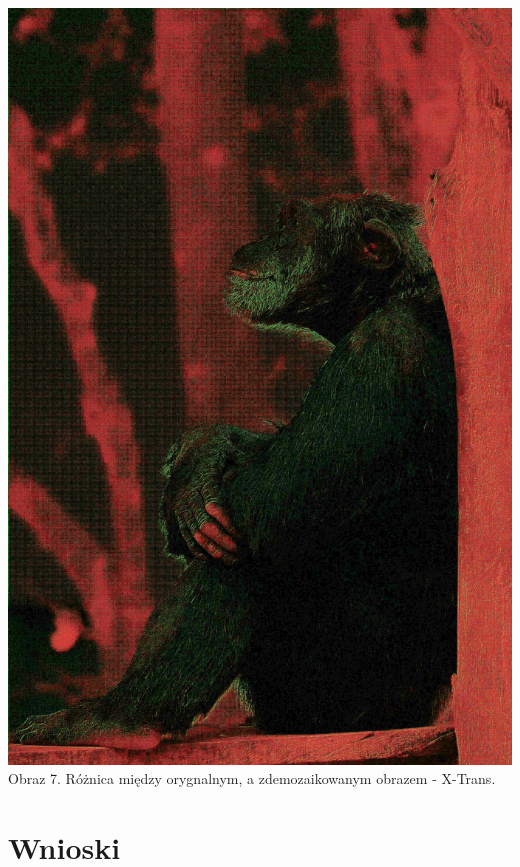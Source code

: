 \documentclass[14pt]{article}
\begin{document}
\begin{center}
    \vspace{0.5cm}
    \includegraphics[scale=0.06]{images/XTRANS_DIFF_br.jpg}
    \\ \small Obraz 7. Różnica między orygnalnym, 
    a zdemozaikowanym obrazem - X-Trans.

    \vspace{1.5cm}
\end{center}

\newpage
\section{Wnioski}
\end{document}
